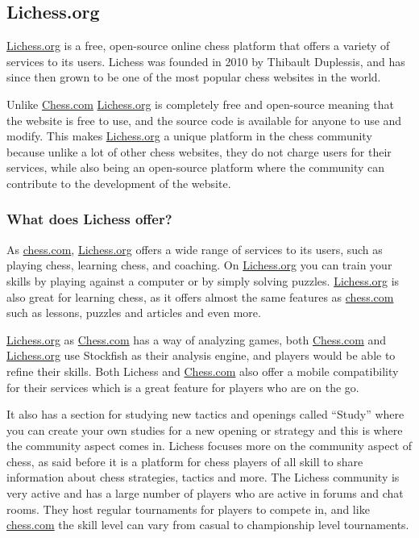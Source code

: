 \subsection{Lichess.org}\label{subsec:lichess-org}

\url{Lichess.org} is a free, open-source online chess platform that offers a variety of services to its users.
Lichess was founded in 2010 by Thibault Duplessis, and has since then grown to be one of the most popular chess websites
in the world.

Unlike \url{Chess.com} \url{Lichess.org} is completely free and open-source meaning that the website is free to use,
and the source
code is available for anyone to use and modify.
This makes \url{Lichess.org} a unique platform in the chess community because unlike a lot of other chess websites,
they do not charge users for their services, while also being an open-source platform where the community can contribute
to the development of the website.

\subsubsection{What does Lichess offer?}\label{subsubsec:what-does-lichess-offer}

As \url{chess.com}, \url{Lichess.org} offers a wide range of services to its users, such as playing chess,
learning chess, and coaching.
On \url{Lichess.org} you can train your skills by playing against a computer or by simply solving puzzles.
\url{Lichess.org} is also great for learning chess, as it offers almost the same features as \url{chess.com}
such as lessons, puzzles and articles and even more.

\url{Lichess.org} as \url{Chess.com} has a way of analyzing games, both \url{Chess.com} and \url{Lichess.org} use
Stockfish as their analysis engine, and players would be able to refine their skills.
Both Lichess and \url{Chess.com} also offer a mobile compatibility for their services which is a great feature for
players who are on the go.

It also has a section for studying new tactics and openings called “Study” where you can create your own studies for
a new opening or strategy and this is where the community aspect comes in.
Lichess focuses more on the community aspect of chess, as said before it is a platform for chess players of all skill
to share information about chess strategies, tactics and more.
The Lichess community is very active and has a large number of players who are active in forums and chat rooms.
They host regular tournaments for players to compete in, and like \url{chess.com} the skill level can vary
from casual to championship level tournaments.
